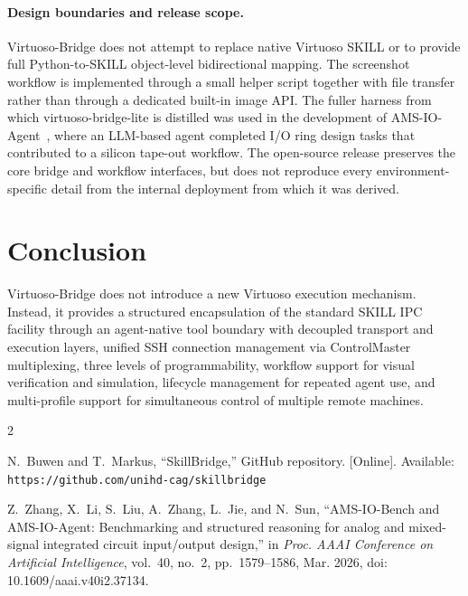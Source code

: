\documentclass[lettersize,journal]{ieee_template/IEEEtran}
\begin{document}
\paragraph{Design boundaries and release scope.} Virtuoso-Bridge does not attempt to replace native Virtuoso SKILL or to provide full Python-to-SKILL object-level bidirectional mapping. The screenshot workflow is implemented through a small helper script together with file transfer rather than through a dedicated built-in image API. The fuller harness from which virtuoso-bridge-lite is distilled was used in the development of AMS-IO-Agent~\cite{amsioagent}, where an LLM-based agent completed I/O ring design tasks that contributed to a silicon tape-out workflow. The open-source release preserves the core bridge and workflow interfaces, but does not reproduce every environment-specific detail from the internal deployment from which it was derived.

\section{Conclusion}

Virtuoso-Bridge does not introduce a new Virtuoso execution mechanism. Instead, it provides a structured encapsulation of the standard SKILL IPC facility through an agent-native tool boundary with decoupled transport and execution layers, unified SSH connection management via ControlMaster multiplexing, three levels of programmability, workflow support for visual verification and simulation, lifecycle management for repeated agent use, and multi-profile support for simultaneous control of multiple remote machines.

\begin{thebibliography}{2}

N.~Buwen and T.~Markus, ``SkillBridge,'' GitHub repository. [Online]. Available: \texttt{https://github.com/unihd-cag/skillbridge}

Z.~Zhang, X.~Li, S.~Liu, A.~Zhang, L.~Jie, and N.~Sun, ``AMS-IO-Bench and AMS-IO-Agent: Benchmarking and structured reasoning for analog and mixed-signal integrated circuit input/output design,'' in \emph{Proc. AAAI Conference on Artificial Intelligence}, vol.~40, no.~2, pp.~1579--1586, Mar. 2026, doi: 10.1609/aaai.v40i2.37134.


\end{thebibliography}
\end{document}
